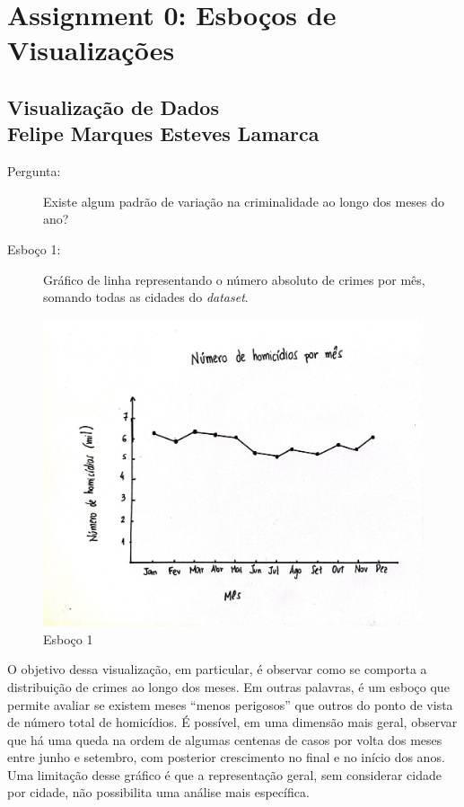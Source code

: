 \documentclass[article,12pt,openright,oneside,a4paper,brazil]{abntex2}
\begin{document}
\setcounter{page}{1}

\section*{\textbf{Assignment 0}: Esboços de Visualizações}
\subsection*{Visualização de Dados \\ Felipe Marques Esteves Lamarca \\}

    \begin{description}
        \item[Pergunta:] Existe algum padrão de variação na criminalidade ao longo dos meses do ano? \\

        \item[Esboço 1:] Gráfico de linha representando o número absoluto de crimes por mês, somando todas as cidades do \textit{dataset}.        
    \end{description}

    \begin{figure}[H]
        \centering
        \includegraphics[width=15cm]{graphs/graph1.jpg}
        \caption{Esboço 1}
        \label{fig:esboco_1}
    \end{figure}

    O objetivo dessa visualização, em particular, é observar como se comporta a distribuição de crimes ao longo dos meses. Em outras palavras, é um esboço que permite avaliar se existem meses ``menos perigosos'' que outros do ponto de vista de número total de homicídios. É possível, em uma dimensão mais geral, observar que há uma queda na ordem de algumas centenas de casos por volta dos meses entre junho e setembro, com posterior crescimento no final e no início dos anos. Uma limitação desse gráfico é que a representação geral, sem considerar cidade por cidade, não possibilita uma análise mais específica. 
\end{document}
